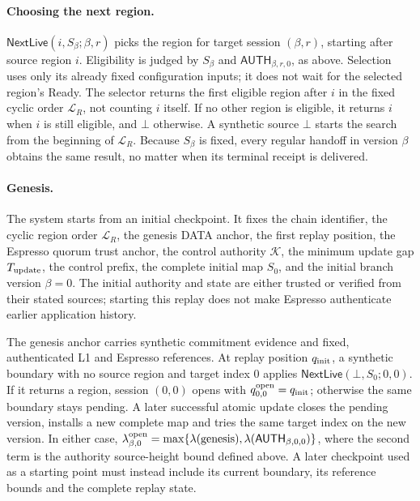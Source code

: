 \documentclass[11pt,a4paper]{article}
\newcommand{\tagg}[1]{\ensuremath{\mathsf{#1}}}
\begin{document}
\paragraph{Choosing the next region.}
$\tagg{NextLive}(i,S_\beta;\beta,r)$ picks the region for target session
$(\beta,r)$, starting after source region $i$. Eligibility is judged by $S_\beta$ and
$\tagg{AUTH}_{\beta,r,0}$, as above. Selection uses only its already fixed
configuration inputs; it does not wait for the selected region's Ready.
The selector returns the first eligible
region after $i$ in the fixed cyclic order $\mathcal L_R$, not counting
$i$ itself. If no other region is eligible, it returns $i$ when $i$ is
still eligible, and $\bot$ otherwise. A synthetic source $\bot$ starts
the search from the beginning of $\mathcal L_R$. Because $S_\beta$ is
fixed, every regular handoff in version $\beta$ obtains the same result,
no matter when its terminal receipt is delivered.

\paragraph{Genesis.}
The system starts from an initial checkpoint. It fixes the chain
identifier, the cyclic region order $\mathcal L_R$, the genesis DATA
anchor, the first replay position, the Espresso quorum trust anchor,
the control authority $\mathcal K$, the minimum update gap
$T_{\rm update}$, the control prefix, the complete initial map $S_0$,
and the initial branch version $\beta=0$. The initial
authority and state are either trusted or verified from their stated
sources; starting this replay does not make Espresso authenticate
earlier application history.

The genesis anchor carries synthetic commitment evidence and fixed,
authenticated L1 and Espresso references. At replay position
$q_{\rm init}$, a synthetic boundary with no source region and target
index 0 applies $\tagg{NextLive}(\bot,S_0;0,0)$. If it returns a region,
session $(0,0)$ opens with $q^{\rm open}_{0,0}=q_{\rm init}$; otherwise
the same boundary stays pending. A later successful atomic update closes
the pending version, installs a new complete map and tries the same target
index on the new version. In either case,
$\lambda^{\rm open}_{\beta,0}=\max\{\lambda(\text{genesis}),
\lambda(\tagg{AUTH}_{\beta,0,0})\}$, where the second term is the
authority source-height bound defined above. A later checkpoint used as a
starting point must instead include its current boundary, its reference
bounds and the complete replay state.
\end{document}
